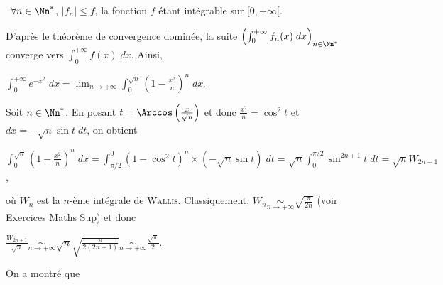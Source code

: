 {\begin{enumerate}
{\textbullet~$\forall n\in\Nn^*$, $|f_n|\leqslant f$, la fonction $f$ étant intégrable sur $[0,+\infty[$.

D'après le théorème de convergence dominée, la suite $\left(\int_{0}^{+\infty}f_n(x)\;dx\right)_{n\in\Nn^*}$ converge vers $\int_{0}^{+\infty}f(x)\;dx$. Ainsi,

\begin{center}
$\int_{0}^{+\infty}e^{-x^2}\;dx=\lim_{n \rightarrow +\infty}\int_{0}^{\sqrt{n}}\left(1-\frac{x^2}{n}\right)^n\;dx$.
\end{center}

Soit $n\in\Nn^*$. En posant $t=\Arccos\left(\frac{x}{\sqrt{n}}\right)$ et donc $\frac{x^2}{n}=\cos^2t$ et $dx=-\sqrt{n}\sin t\;dt$, on obtient

\begin{center}
$\int_{0}^{\sqrt{n}}\left(1-\frac{x^2}{n}\right)^n\;dx=\int_{\pi/2}^{0}(1-\cos^2t)^n\times(-\sqrt{n}\sin t)\;dt=\sqrt{n}\int_{0}^{\pi/2}\sin^{2n+1}t\;dt=\sqrt{n}W_{2n+1}$,
\end{center}

où $W_n$ est la $n$-ème intégrale de \textsc{Wallis}. Classiquement, $W_n\underset{n\rightarrow+\infty}{\sim}\sqrt{\frac{\pi}{2n}}$ (voir Exercices Maths Sup) et donc

\begin{center}
$\frac{W_{2n+1}}{\sqrt{n}}\underset{n\rightarrow+\infty}{\sim}\sqrt{n}\sqrt{\frac{\pi}{2(2n+1)}}\underset{n\rightarrow+\infty}{\sim}\frac{\sqrt{\pi}}{2}$.
\end{center}

On a montré que

\begin{center}
\end{center}}
\end{enumerate}
}
